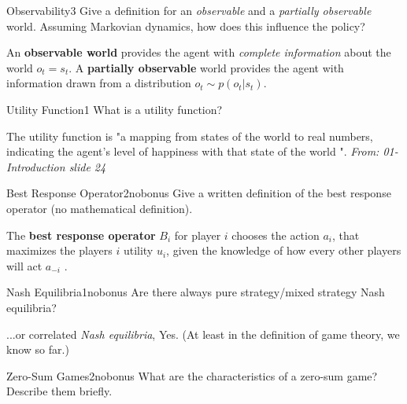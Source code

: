 \documentclass[twoside,english,colorbacktitle,accentcolor=tud9c,10pt]{tudexercise}
\begin{document}
\begin{questions}
\begin{question}{Observability}{3}{}
	Give a definition for an \emph{observable} and a \emph{partially observable} world. Assuming Markovian dynamics, how does this influence the policy?
\end{question}
	\newline
\newline
	An \textbf{observable world} provides the agent with \textit{complete information} about the world $o_t = s_t $.
	A \textbf{partially observable} world provides the agent with information drawn from a distribution $o_t \sim p(o_t|s_t)$.
	\newline	

\begin{question}{Utility Function}{1}{}
	What is a utility function?
\end{question}
	\newline
\newline
	The utility function is "a mapping from states of the world to real numbers, indicating the agent's level of happiness with that state of the world ".
	\textit{From: 01-Introduction slide 24}
	\newline	

\begin{question}{Best Response Operator}{2}{nobonus}
	Give a written definition of the best response operator (no mathematical definition).
\end{question}
	\newline
\newline
	The \textbf{best response operator} $B_i$ for player $i$ chooses the action $a_i$, that maximizes the players $i$ utility $u_i$, given the knowledge of how every other players will act $a_{-i}$ .
	\newline	

\begin{question}{Nash Equilibria}{1}{nobonus}
	Are there always pure strategy/mixed strategy Nash equilibria? 
\end{question}
	\newline
\newline
	...or correlated \textit{Nash equilibria}, Yes. (At least in the definition of game theory, we know so far.)
	\newline	

\begin{question}{Zero-Sum Games}{2}{nobonus}
	What are the characteristics of a zero-sum game? Describe them briefly.
\end{question}
	\newline


\end{questions}
\end{document}
